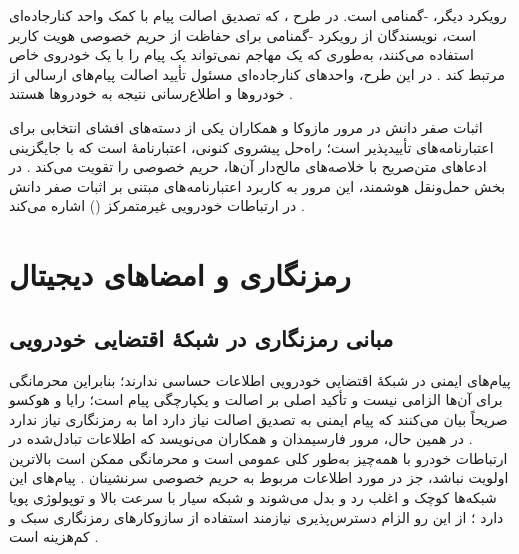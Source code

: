 \documentclass[12pt,a4paper]{article}
\begin{document}
رویکرد دیگر، -گمنامی است. در طرح ، که تصدیق اصالت پیام با کمک واحد کنارجاده‌ای است، نویسندگان از رویکرد -گمنامی برای حفاظت از حریم خصوصی هویت کاربر استفاده می‌کنند، به‌طوری که یک مهاجم نمی‌تواند یک پیام را با یک خودروی خاص مرتبط کند \cite{zhangRAISEEfficientRSUAided2008}. در این طرح، واحد‌های کنارجاده‌ای مسئول تأیید اصالت پیام‌های ارسالی از خودرو‌ها و اطلاع‌رسانی نتیجه به خودرو‌ها هستند \cite{zhangRAISEEfficientRSUAided2008}.

اثبات صفر دانش در مرور مازوکا و همکاران یکی از دسته‌های افشای انتخابی برای اعتبارنامه‌های تأییدپذیر است؛ راه‌حل پیشروی کنونی، اعتبارنامهٔ  است که با جایگزینی ادعا‌های متن‌صریح با خلاصه‌های مالح‌دار آن‌ها، حریم خصوصی را تقویت می‌کند \cite{mazzocca2025survey}. در بخش حمل‌ونقل هوشمند، این مرور به کاربرد اعتبارنامه‌های مبتنی بر اثبات صفر دانش در ارتباطات خودرویی غیرمتمرکز () اشاره می‌کند \cite{mazzocca2025survey}.

\section{رمزنگاری و امضا‌های دیجیتال}

\subsection{مبانی رمزنگاری در شبکهٔ اقتضایی خودرویی}

پیام‌های ایمنی در شبکهٔ اقتضایی خودرویی اطلاعات حساسی ندارند؛ بنابراین محرمانگی برای آن‌ها الزامی نیست و تأکید اصلی بر اصالت و یکپارچگی پیام است؛ رایا و هوکسو صریحاً بیان می‌کنند که پیام ایمنی به تصدیق اصالت نیاز دارد اما به رمزنگاری نیاز ندارد \cite{SecuringVehicularAd}. در همین حال، مرور فارسیمدان و همکاران می‌نویسد که اطلاعات تبادل‌شده در ارتباطات خودرو با همه‌چیز به‌طور کلی عمومی است و محرمانگی ممکن است بالاترین اولویت نباشد، جز در مورد اطلاعات مربوط به حریم خصوصی سرنشینان \cite{farsimadanReviewSecurityChallenges2025}. پیام‌های این شبکه‌ها کوچک و اغلب رد و بدل می‌شوند و شبکه سیار با سرعت بالا و توپولوژی پویا دارد \cite{farsimadanReviewSecurityChallenges2025}؛ از این رو الزام دسترس‌پذیری نیازمند استفاده از سازوکار‌های رمزنگاری سبک و کم‌هزینه است \cite{farsimadanReviewSecurityChallenges2025}.
\end{document}
